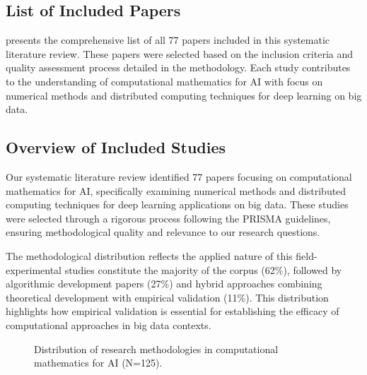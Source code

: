 \documentclass[a4paper,12pt]{acm/acmart}
\begin{document}
\subsection{List of Included Papers}\label{subsec:list-of-included-papers}
 presents the comprehensive list of all 77 papers included in this systematic literature review. These papers were selected based on the inclusion criteria and quality assessment process detailed in the methodology. Each study contributes to the understanding of computational mathematics for AI with focus on numerical methods and distributed computing techniques for deep learning on big data.



\subsection{Overview of Included Studies}\label{subsec:overview-of-included-studies}
Our systematic literature review identified 77 papers focusing on computational mathematics for AI, specifically examining numerical methods and distributed computing techniques for deep learning applications on big data. These studies were selected through a rigorous process following the PRISMA guidelines, ensuring methodological quality and relevance to our research questions.

The methodological distribution reflects the applied nature of this field-experimental studies constitute the majority of the corpus (62\%), followed by algorithmic development papers (27\%) and hybrid approaches combining theoretical development with empirical validation (11\%). This distribution highlights how empirical validation is essential for establishing the efficacy of computational approaches in big data contexts.

\begin{figure}[ht]
    \centering
    \caption{Distribution of research methodologies in computational mathematics for AI (N=125).}
    \label{fig:methodology_distribution}
\end{figure}
\end{document}
